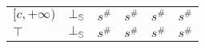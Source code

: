 \documentclass{beamer}
\begin{document}
\begin{frame}
\begin{table}
{\begin{tabular}{|l|l|ll|ll|ll|l|}
        \multirow{3}{*}{$[c, +\infty)$} & \multirow{3}{*}{$\bot_\mathbb{S}$} & \multicolumn{2}{l|}{\multirow{3}{*}{$s^\#$}}                                       & \multicolumn{2}{l|}{\multirow{3}{*}{$s^\#$}}             & \multicolumn{2}{l|}{\multirow{3}{*}{$s^\#$}}                                       & \multirow{3}{*}{$s^\#$} \\
                                        &                         & \multicolumn{2}{l|}{}                                                              & \multicolumn{2}{l|}{}                                    & \multicolumn{2}{l|}{}                                                              &                         \\
                                        &                         & \multicolumn{2}{l|}{}                                                              & \multicolumn{2}{l|}{}                                    & \multicolumn{2}{l|}{}                                                              &                         \\ \hline
        $\top$                          & $\bot_\mathbb{S}$                  & \multicolumn{2}{l|}{$s^\#$}                                                        & \multicolumn{2}{l|}{$s^\#$}                              & \multicolumn{2}{l|}{$s^\#$}                                                        & $s^\#$                  \\ \hline
        \end{tabular}
        }
        \end{table}
    \end{frame}
    
\end{document}
